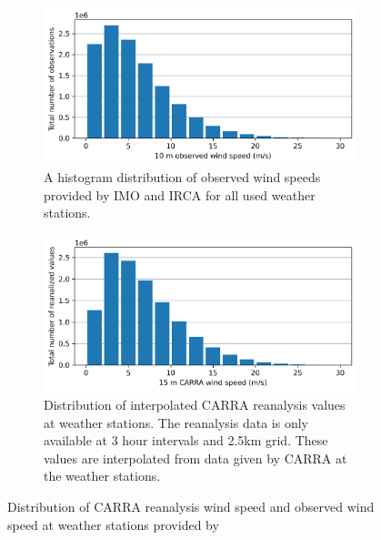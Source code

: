 \begin{figure}[ht]
    \centering
    \begin{subfigure}[b]{0.8\textwidth}
        \centering
        \includegraphics[width=\textwidth]{Figures/obs_wind_speeds.png}
        \caption[Histogram of observed wind speeds]{A histogram distribution of observed wind speeds provided by IMO and IRCA for all used weather stations.}
        \label{fig:obs_wind_speeds}
    \end{subfigure}
    
    \vspace{0.5cm} %

    \begin{subfigure}[b]{0.8\textwidth}
        \centering
        \includegraphics[width=\textwidth]{Figures/carra_wind_speeds.png}
        \caption[Distribution of interpolated CARRA wind speeds at weather stations]{Distribution of interpolated CARRA reanalysis values at weather stations. The reanalysis data is only available at 3 hour intervals and 2.5km grid. These values are interpolated from data given by CARRA at the weather stations.}
        \label{fig:carra_wind_speeds}
    \end{subfigure}

    \caption[Distribution of CARRA and observed wind speeds]{Distribution of CARRA reanalysis wind speed and observed wind speed at weather stations provided by}
    \label{fig:obs_carra_wind_speeds}
\end{figure}

